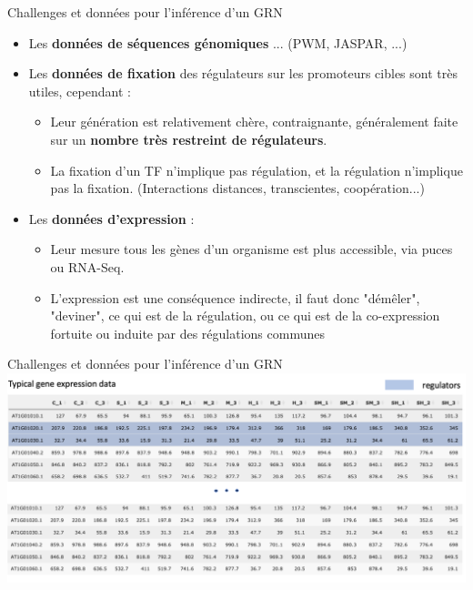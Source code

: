 	\begin{frame}{Challenges et données pour l'inférence d'un GRN}
\begin{itemize}
   \item Les \textbf{données de séquences génomiques} ... (PWM, JASPAR, ...)
    \pause
    \item Les \textbf{données de fixation} des régulateurs sur les promoteurs cibles sont très utiles, cependant : 
    
    \begin{itemize}\scriptsize
        \item Leur génération est relativement chère, contraignante, généralement faite sur un \textbf{nombre très restreint de régulateurs}. 
        \item La fixation d'un TF n'implique pas régulation, et la régulation n'implique pas la fixation. (Interactions distances, transcientes, coopération...)
    \end{itemize}
      \pause
    
    \item Les \textbf{données d'expression} :
    
    \begin{itemize}\scriptsize
        \item Leur mesure tous les gènes d'un organisme est plus accessible, via puces ou RNA-Seq.
        \item L'expression est une conséquence indirecte, il faut donc "démêler", "deviner", ce qui est de la régulation, ou ce qui est de la co-expression fortuite ou induite par des régulations communes
        \end{itemize}
\end{itemize}
	\end{frame}
	
	
	

\begin{frame}{Challenges et données pour l'inférence d'un GRN}
    \includegraphics[scale = 0.17]{Figures/Intro/expression_data.png}
\end{frame}

